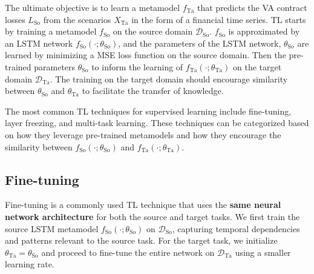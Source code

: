 The ultimate objective is to learn a metamodel $f_{\text{Ta}}$ that predicts the VA contract losses $L_{\text{So}}$ from the scenarios $X_{\text{Ta}}$ in the form of a financial time series.
TL starts by training a metamodel $f_{\text{So}}$ on the source domain $\mathcal{D}_{\text{So}}$.
$f_{\text{So}}$ is approximated by an LSTM network $f_{\text{So}}(\cdot ; \theta_{\text{So}})$, and the parameters of the LSTM network, $\theta_{\text{So}}$ are learned by minimizing a MSE loss function on the source domain.
Then the pre-trained parameters $\theta_{\text{So}}$ to inform the learning of $f_{\text{Ta}}(\cdot ; \theta_{\text{Ta}})$ on the target domain $\mathcal{D}_{\text{Ta}}$.
The training on the target domain should encourage similarity between $\theta_{\text{So}}$ and $\theta_{\text{Ta}}$ to facilitate the transfer of knowledge.

The most common TL techniques for supervised learning include fine-tuning, layer freezing, and multi-task learning. 
These techniques can be categorized based on how they leverage pre-trained metamodels and how they encourage the similarity between $f_{\text{So}}(\cdot ; \theta_{\text{So}})$ and $f_{\text{Ta}}(\cdot ; \theta_{\text{Ta}})$.

\subsection{Fine-tuning}

Fine-tuning is a commonly used TL technique that uses the \textbf{same neural network architecture} for both the source and target tasks.
We first train the source LSTM metamodel $f_{\text{So}}(\cdot; \theta_{\text{So}})$ on $\mathcal{D}_{\text{So}}$, capturing temporal dependencies and patterns relevant to the source task. 
For the target task, we initialize $\theta_{\text{Ta}} = \theta_{\text{So}}$ and proceed to fine-tune the entire network on $\mathcal{D}_{\text{Ta}}$ using a smaller learning rate. 

